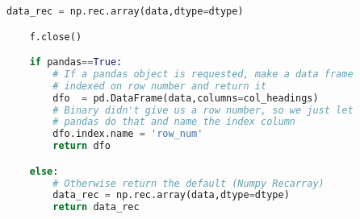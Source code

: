 \begin{lstlisting}[language=Python]
    data_rec = np.rec.array(data,dtype=dtype)

    f.close()

    if pandas==True:
        # If a pandas object is requested, make a data frame
        # indexed on row number and return it
        dfo  = pd.DataFrame(data,columns=col_headings)
        # Binary didn't give us a row number, so we just let
        # pandas do that and name the index column
        dfo.index.name = 'row_num'
        return dfo

    else:
        # Otherwise return the default (Numpy Recarray)
        data_rec = np.rec.array(data,dtype=dtype)
        return data_rec
        
\end{lstlisting}